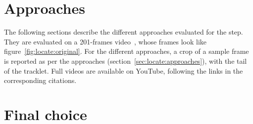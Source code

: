 \section{Approaches}

The following sections describe the different approaches evaluated for the \linkDD* step.
They are evaluated on a 201-frames video~\cite{linkDD-original}, whose frames look like figure~\ref{fig:locate:original}.
For the different approaches, a crop of a sample frame is reported as per the \locate* approaches (section~\ref{sec:locate:approaches}), with the tail of the tracklet.
Full videos are available on YouTube, following the links in the corresponding citations.

\newpage
 \newpage
 \newpage
 \newpage
 \newpage

\section{Final choice}
